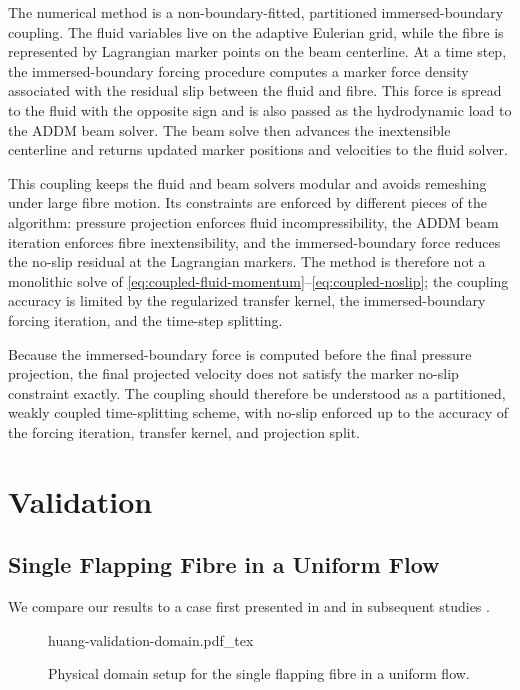 The numerical method is a non-boundary-fitted, partitioned immersed-boundary
coupling. The fluid variables live on the adaptive Eulerian grid, while the
fibre is represented by Lagrangian marker points on the beam centerline. At a
time step, the immersed-boundary forcing procedure computes a marker force
density associated with the residual slip between the fluid and fibre. This
force is spread to the fluid with the opposite sign and is also passed as the
hydrodynamic load to the ADDM beam solver. The beam solve then advances the
inextensible centerline and returns updated marker positions and velocities to
the fluid solver.

This coupling keeps the fluid and beam solvers modular and avoids remeshing
under large fibre motion. Its constraints are enforced by different pieces of
the algorithm: pressure projection enforces fluid incompressibility, the ADDM
beam iteration enforces fibre inextensibility, and the immersed-boundary force
reduces the no-slip residual at the Lagrangian markers. The method is therefore
not a monolithic solve of
\eqref{eq:coupled-fluid-momentum}--\eqref{eq:coupled-noslip}; the coupling
accuracy is limited by the regularized transfer kernel, the immersed-boundary
forcing iteration, and the time-step splitting.

Because the immersed-boundary force is computed before the final pressure
projection, the final projected velocity does not satisfy the marker no-slip
constraint exactly. The coupling should therefore be understood as a
partitioned, weakly coupled time-splitting scheme, with no-slip enforced up to
the accuracy of the forcing iteration, transfer kernel, and projection split.

\section{Validation}

\subsection{Single Flapping Fibre in a Uniform Flow}

We compare our results to a case first presented in
\textcite{huang_simulation_2007} and in subsequent studies
\cite{wang_combined_2008,xin_efficient_2023,goza_strongly-coupled_2016,lee_discrete-forcing_2015,wang_strongly_2015}.

\begin{figure}[t]
    \centering
    \def\svgwidth{0.5\textwidth}
    {huang-validation-domain.pdf_tex}
    \caption{Physical domain setup for the single flapping fibre in a uniform flow.}
    \label{fig:flapping-fibre-validation}
\end{figure}

